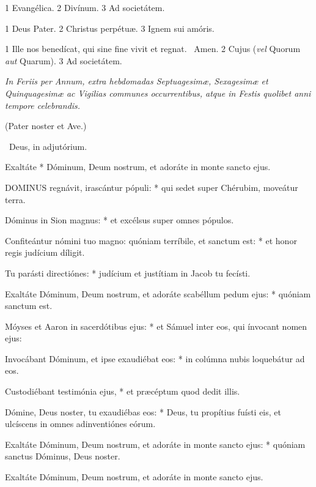 
 1 Evangélica. 2 Divínum. 3 Ad societátem.


 1 Deus Pater. 2 Christus perpétuæ. 3 Ignem sui amóris.


 1 Ille nos benedícat, qui sine fine vivit et regnat. \R\ Amen. 2 Cujus (\textit{vel} Quorum \textit{aut} Quarum). 3 Ad societátem.

\sectionornament


\textit{In Feriis per Annum, extra hebdomadas Septuagesimæ, Sexagesimæ et Quinquagesimæ ac Vigilias communes occurrentibus, atque in Festis quolibet anni tempore celebrandis.}

(Pater noster et Ave.)

\V\ Deus, in adjutórium.

 Exaltáte * Dóminum, Deum nostrum, et adoráte in monte sancto ejus.


\lettrine[lines=2]{D}{OMINUS} regnávit, irascántur pópuli: * qui sedet super Chérubim, moveátur terra.

Dóminus in Sion magnus: * et excélsus super omnes pópulos.

Confiteántur nómini tuo magno: quóniam terríbile, et sanctum est: * et honor regis judícium díligit.

Tu parásti directiónes: * judícium et justítiam in Jacob tu fecísti.

Exaltáte Dóminum, Deum nostrum, et adoráte scabéllum pedum ejus: * quóniam sanctum est.

Móyses et Aaron in sacerdótibus ejus: * et Sámuel inter eos, qui ínvocant nomen ejus:

Invocábant Dóminum, et ipse exaudiébat eos: * in colúmna nubis loquebátur ad eos.

Custodiébant testimónia ejus, * et præcéptum quod dedit illis.

Dómine, Deus noster, tu exaudiébas eos: * Deus, tu propítius fuísti eis, et ulcíscens in omnes adinventiónes eórum.

Exaltáte Dóminum, Deum nostrum, et adoráte in monte sancto ejus: * quóniam sanctus Dóminus, Deus noster.

 Exaltáte Dóminum, Deum nostrum, et adoráte in monte sancto ejus.

